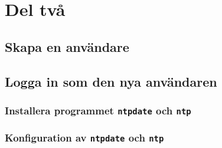 %
%
%


\section{Del två}


\subsection{Skapa en användare}


\subsection{Logga in som den nya användaren}

\subsubsection{Installera programmet \texttt{ntpdate} och \texttt{ntp}}

\subsubsection{Konfiguration av \texttt{ntpdate} och \texttt{ntp}}
%



